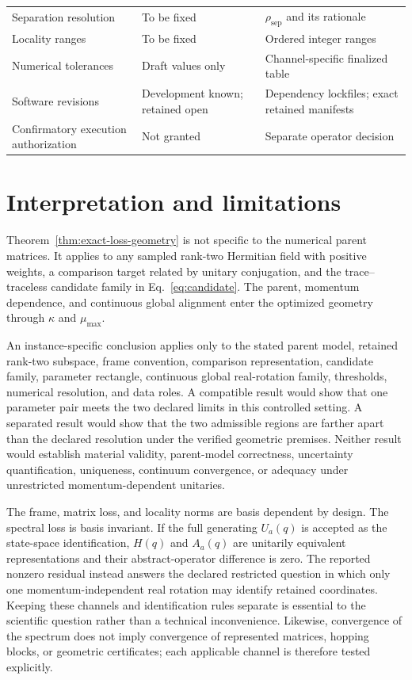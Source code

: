 \documentclass[11pt]{article}
\begin{document}
\begin{table}[htbp]
\begin{tabular}{>{\raggedright\arraybackslash}p{}
                >{\raggedright\arraybackslash}p{}
                >{\raggedright\arraybackslash}p{}}
Separation resolution & To be fixed & $\rho_{\mathrm{sep}}$ and its rationale \\
Locality ranges & To be fixed & Ordered integer ranges \\
Numerical tolerances & Draft values only & Channel-specific finalized table \\
Software revisions & Development known; retained open &
Dependency lockfiles; exact retained manifests \\
Confirmatory execution authorization & Not granted & Separate operator decision \\
\bottomrule
\end{tabular}
\end{table}

\section{Interpretation and limitations}

Theorem~\ref{thm:exact-loss-geometry} is not specific to the numerical parent matrices.
It applies to any sampled rank-two Hermitian field with positive weights, a comparison
target related by unitary conjugation, and the trace--traceless candidate family in
Eq.~\eqref{eq:candidate}. The parent, momentum dependence, and continuous global
alignment enter the optimized geometry through $\kappa$ and $\mu_{\max}$.

An instance-specific conclusion applies only to the stated parent model, retained
rank-two subspace, frame convention, comparison representation, candidate family,
parameter rectangle, continuous global real-rotation family, thresholds, numerical
resolution, and data roles.
A compatible result would show that one parameter pair meets the two declared limits in
this controlled setting. A separated result would show that the two admissible regions
are farther apart than the declared resolution under the verified geometric premises.
Neither result would establish material validity, parent-model correctness, uncertainty
quantification, uniqueness, continuum convergence, or adequacy under unrestricted
momentum-dependent unitaries.

The frame, matrix loss, and locality norms are basis dependent by design. The spectral
loss is basis invariant. If the full generating $U_a(q)$ is accepted as the state-space
identification, $H(q)$ and $A_a(q)$ are unitarily equivalent representations and their
abstract-operator difference is zero. The reported nonzero residual instead answers the
declared restricted question in which only one momentum-independent real rotation may
identify retained coordinates. Keeping these channels and identification rules separate
is essential to the scientific question rather than a technical inconvenience.
Likewise, convergence of the spectrum does not imply convergence of represented
matrices, hopping blocks, or geometric certificates; each applicable channel is
therefore tested explicitly.
\end{document}

